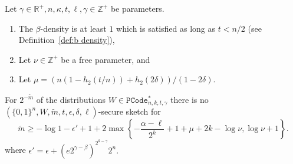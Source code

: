 \begin{theorem}
Let $\gamma \in\mathbb{R}^+, n, \kappa, t, \ell, \gamma \in\mathbb{Z}^+$ be parameters.
\begin{enumerate}
\itemsep0em
\item The $\beta$-density is at least $1$ which is  satisfied as long as $t< n/2 $ (see Definition~\ref{def:b density}),
\item Let $\nu \in \mathbb{Z}^+$ be a free parameter, and
\item Let $\mu =(n(1-h_2(t/n)) +h_2(2\delta))/(1-2\delta)$.
\end{enumerate}
For $2^{-\tilde{m}}$ of the distributions $W\in \mathtt{PCode}_{n, k, t, \gamma}^{*}$ there is no $(\{0,1\}^n, W, \tilde{m}, t, \epsilon,\delta, \ell)$-secure sketch for 
\[
\tilde{m}\ge  -\log{1-\epsilon'} +1 + 2\max\left\{-\frac{\alpha-\ell}{2^k}+1+\mu+2k-\log{\nu}, \log{\nu+1}\right\}.
\]
where $\epsilon' = \epsilon+\left(e2^{\gamma-\beta}\right)^{2^{k-\gamma}}2^n.$
\label{thm:main theorem ss}
\end{theorem}

